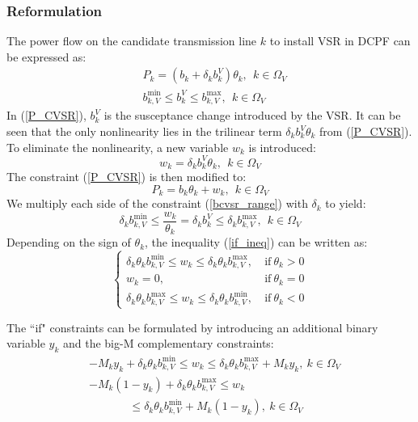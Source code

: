 \documentclass[journal]{IEEEtran}
\begin{document}
\subsubsection{Reformulation}
The power flow on the candidate transmission line $k$ to install VSR in DCPF can be expressed as:
\begin{align}
&P_{k}=(b_{k}+\delta_{k} b_{k}^{V})\theta_k,\ \ k\in \Omega_{V} \label{P_CVSR}  \\
&b_{k,V}^{\min} \le b_{k}^{V} \le b_{k,V}^{\max}, \ \ k\in \Omega_V   \label{bcvsr_range}
\end{align} 
In (\ref{P_CVSR}), $b_k^V$ is the susceptance change introduced by the VSR. It can be seen that the only nonlinearity lies in the trilinear term $\delta_{k}b_{k}^{V}\theta_{k}$ from (\ref{P_CVSR}). To eliminate the nonlinearity, a new variable $w_{k}$ is introduced:
\begin{equation}
w_{k}=\delta_{k}b_{k}^{V}\theta_{k}, \ \ k\in \Omega_{V} \label{wij}
\end{equation}
The constraint (\ref{P_CVSR}) is then modified to:
\begin{equation}
P_{k}=b_{k}\theta_k+w_{k}, \ \ k\in \Omega_{V} \label{PCVSR_wij}
\end{equation}
We multiply each side of the constraint (\ref{bcvsr_range}) with $\delta_{k}$ to yield:
\begin{equation}
\delta_{k} b_{k,V}^{\min} \le \frac{w_{k}}{\theta_{k}}=\delta_{k}b_{k}^{V} \le \delta_{k} b_{k,V}^{\max},\ \ k\in \Omega_{V}  \label{if_ineq}
\end{equation}
Depending on the sign of $\theta_{k}$, the inequality (\ref{if_ineq}) can be written as:
\begin{equation}
\left\lbrace 
\begin{aligned}
\delta_{k}\theta_{k} b_{k,V}^{\min} \le w_{k} \le \delta_{k}\theta_{k} b_{k,V}^{\max}, \ &\text{if} \ \theta_{k}>0  \\
w_{k}=0,\ \ \ \ \ \ \ \ \ \ \ \ \ \ \ \ \ \ \ \ \ \ \ \ \ &\text{if} \ \theta_{k}=0   \\
\delta_{k}\theta_{k} b_{k,V}^{\max} \le w_{k} \le \delta_{k}\theta_{k} b_{k,V}^{\min}, \ &\text{if} \ \theta_{k}<0 
\end{aligned} \right.
\end{equation}

The ``if" constraints can be formulated by introducing an additional binary variable $y_{k}$ and the big-M complementary constraints:
\begin{align}
&-M_{k}y_{k}+\delta_{k}\theta_{k}b_{k,V}^{\min} \le w_{k} \le \delta_{k}\theta_{k}b_{k,V}^{\max}+M_{k}y_{k},\ k\in \Omega_{V} \label{if_1} \\
&-M_{k}(1-y_{k})+\delta_{k}\theta_{k}b_{k,V}^{\max} \le w_{k}  \nonumber \\
&\ \ \ \ \ \ \ \ \ \ \ \ \ \ \ \  \le \delta_{k}\theta_{k}b_{k,V}^{\min}+M_{k}(1-y_{k}),\ k\in \Omega_{V} \label{if_2} 
\end{align}
\end{document}

